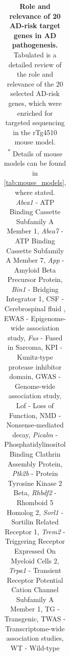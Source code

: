 	\begin{landscape}
		\small %
		\setlength\tabcolsep{2pt} %
		\begin{longtable}[c]{p{1cm}p{2cm}p{4cm}p{19cm}}
			\caption[Role and relevance of 20 AD-risk target genes in AD pathogenesis]%
			{\textbf{Role and relevance of 20 AD-risk target genes in AD pathogenesis.} Tabulated is a detailed review of the role and relevance of the 20 selected AD-risk genes, which were enriched for targeted sequencing in the rTg4510 mouse model. \\
			\textsuperscript{*} Details of mouse models can be found in \cref{tab:mouse_models}, where stated. \\ 
			\textit{Abca1} - ATP Binding Cassette Subfamily A Member 1, \textit{Abca7} - ATP Binding Cassette Subfamily A Member 7, \textit{App} - Amyloid Beta Precursor Protein, \textit{Bin1} - Bridging Integrator 1, CSF - Cerebrospinal fluid , EWAS - Epigenome-wide association study, \textit{Fus} - Fused in Sarcoma, KPI - Kunitz-type protease inhibitor domain, GWAS - Genome-wide association study, Lof - Loss of Function, NMD - Nonsense-mediated decay, \textit{Picalm} - Phosphatidylinositol Binding Clathrin Assembly Protein, \textit{Ptk2b} - Protein Tyrosine Kinase 2 Beta,  \textit{Rhbdf2} - Rhomboid 5 Homolog 2, \textit{Sorl1} - Sortilin Related Receptor 1, \textit{Trem2} - Triggering Receptor Expressed On Myeloid Cells 2, \textit{Trpa1} - Transient Receptor Potential Cation Channel Subfamily A Member 1, TG - Transgenic, TWAS - Transcriptome-wide association studies, WT - Wild-type}
			\label{tab: TargetGenes_LitReview}\\
			

\end{longtable}
\end{landscape}
